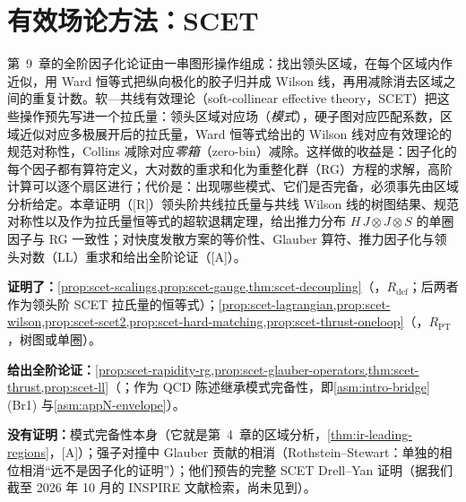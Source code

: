 \chapter{有效场论方法：SCET}\label{ch:scet}

第~9~章的全阶因子化论证由一串图形操作组成：找出领头区域，在每个区域内作近似，用 Ward 恒等式把纵向极化的胶子归并成 Wilson 线，再用减除消去区域之间的重复计数。软—共线有效理论（soft-collinear effective theory，SCET）\cite{BauerFlemingLuke2000,BauerEtAl2001,BauerStewart2001,BauerPirjolStewart2002,BauerEtAl2002}把这些操作预先写进一个拉氏量：领头区域对应场（\emph{模式}），硬子图对应匹配系数，区域近似对应多极展开后的拉氏量，Ward 恒等式给出的 Wilson 线对应有效理论的规范对称性，Collins 减除对应\emph{零箱}（zero-bin）减除。这样做的收益是：因子化的每个因子都有算符定义，大对数的重求和化为重整化群（RG）方程的求解，高阶计算可以逐个扇区进行；代价是：出现哪些模式、它们是否完备，必须事先由区域分析给定。本章证明（[R]）领头阶共线拉氏量与共线 Wilson 线的树图结果、规范对称性以及作为拉氏量恒等式的超软退耦定理，给出推力分布 $H\,J\otimes J\otimes S$ 的单圈因子与 RG 一致性；对快度发散方案的等价性、Glauber 算符、推力因子化与领头对数（LL）重求和给出全阶论证（[A]）。

\begin{tcolorbox}[enhanced,breakable,title=本章证明了什么／没有证明什么,fonttitle=\bfseries,
  colback=gray!3!white,colframe=gray!55!black,boxrule=0.6pt,arc=2pt,
  left=5pt,right=5pt,top=3pt,bottom=3pt,before skip=6pt,after skip=6pt]
\textbf{证明了：}\cref{prop:scet-scalings,prop:scet-gauge,thm:scet-decoupling}（\tagR，$R_{\mathrm{def}}$；后两者作为领头阶 SCET 拉氏量的恒等式）；\cref{prop:scet-lagrangian,prop:scet-wilson,prop:scet-scet2,prop:scet-hard-matching,prop:scet-thrust-oneloop}（\tagR，$R_{\mathrm{PT}}$，树图或单圈）。\par
\textbf{给出全阶论证：}\cref{prop:scet-rapidity-rg,prop:scet-glauber-operators,thm:scet-thrust,prop:scet-ll}（\tagA；作为 QCD 陈述继承模式完备性，即\cref{asm:intro-bridge}(Br1) 与\cref{asm:appN-envelope}）。\par
\textbf{没有证明：}模式完备性本身（它就是第~4~章的区域分析，\cref{thm:ir-leading-regions}，[A]）；强子对撞中 Glauber 贡献的相消（Rothstein--Stewart：单独的相位相消“远不是因子化的证明”）；他们预告的完整 SCET Drell--Yan 证明（据我们截至 2026 年 10 月的 INSPIRE 文献检索，尚未见到）。
\end{tcolorbox}

